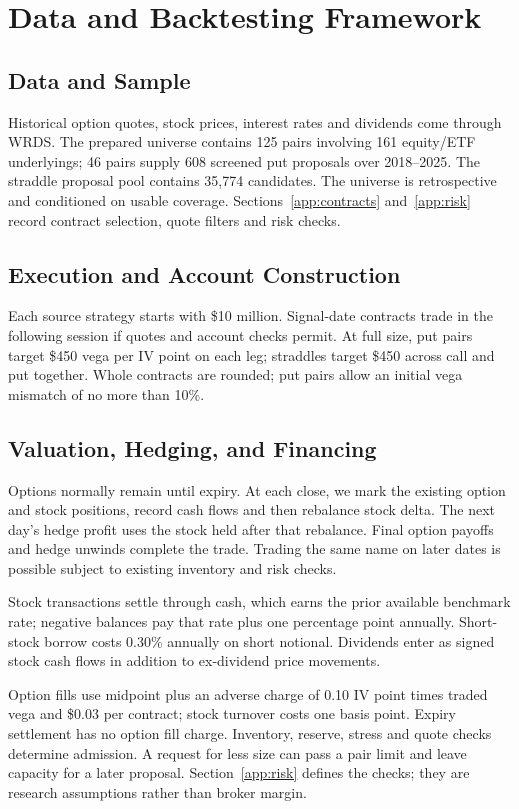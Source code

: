 \section{Data and Backtesting Framework}\label{sec:data}\label{sec:9}

\subsection{Data and Sample}
Historical option quotes, stock prices, interest rates and dividends come through WRDS. The prepared universe contains 125 pairs involving 161 equity/ETF underlyings; 46 pairs supply 608 screened put proposals over 2018--2025. The straddle proposal pool contains 35,774 candidates. The universe is retrospective and conditioned on usable coverage. Sections~\ref{app:contracts} and~\ref{app:risk} record contract selection, quote filters and risk checks.

\subsection{Execution and Account Construction}
Each source strategy starts with \$10 million. Signal-date contracts trade in the following session if quotes and account checks permit. At full size, put pairs target \$450 vega per IV point on each leg; straddles target \$450 across call and put together. Whole contracts are rounded; put pairs allow an initial vega mismatch of no more than 10\%.

\subsection{Valuation, Hedging, and Financing}
Options normally remain until expiry. At each close, we mark the existing option and stock positions, record cash flows and then rebalance stock delta. The next day's hedge profit uses the stock held after that rebalance. Final option payoffs and hedge unwinds complete the trade. Trading the same name on later dates is possible subject to existing inventory and risk checks.


Stock transactions settle through cash, which earns the prior available benchmark rate; negative balances pay that rate plus one percentage point annually. Short-stock borrow costs 0.30\% annually on short notional. Dividends enter as signed stock cash flows in addition to ex-dividend price movements.


Option fills use midpoint plus an adverse charge of 0.10 IV point times traded vega and \$0.03 per contract; stock turnover costs one basis point. Expiry settlement has no option fill charge. Inventory, reserve, stress and quote checks determine admission. A request for less size can pass a pair limit and leave capacity for a later proposal. Section~\ref{app:risk} defines the checks; they are research assumptions rather than broker margin.

